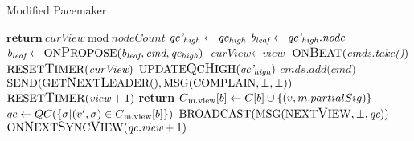 \begin{algorithm}[h!]
	\caption{Modified Pacemaker}\label{pacemaker}
	\begin{algorithmic}[1]
		\color{Green}
		\State $\textbf{return}\ \textit{curView}\ \text{mod}\ \textit{nodeCount}$
		\color{black}
	\EndFunction
			\State $ \textit{qc'\textsubscript{high}} \gets \textit{qc\textsubscript{high}} $
			\State $ \textit{b\textsubscript{leaf}} \gets \textit{qc'\textsubscript{high}.node}$
		\EndIf
	\EndProcedure
			\State $ \textit{b\textsubscript{leaf}} \gets \text{ON{\large P}ROPOSE}(\textit{b\textsubscript{leaf}}, \textit{cmd}, \textit{qc\textsubscript{high}})$
		\EndIf
	\EndProcedure
		\color{Magenta}
		\State $ \textit{curView} \gets \textit{view}$
		\State $ \text{ON{\large B}EAT}(\textit{cmds.take()})$
		\State $ \text{RESET{\large T}IMER}(\textit{curView})$
		\color{black}
	\EndProcedure
		\State $ \text{UPDATE{\large Q}C{\large H}IGH}(\textit{qc'\textsubscript{high}}) $
	\EndProcedure
	\color{Green}
		\State $ \textit{cmds.add(cmd)} $
	\EndProcedure
		\State $ \text{SEND}(\text{GET{\large N}EXT{\large L}EADER}(), \text{MSG}(\text{COMPLAIN}, \bot, \bot)) $
		\State $ \text{RESET{\large T}IMER}(\textit{view} + 1) $
	\EndProcedure
				\State \textbf{return}
			\EndIf
			\State $C\textsubscript{m.view}[b] \gets C[b] \cup \{(v, m.partialSig)\}$
				\State $qc \gets QC(\{ \sigma | (v', \sigma) \in C\textsubscript{m.view}[b]\})$
				\State $\text{BROADCAST}(\text{MSG}(\text{NEXT{\large V}IEW}, \bot, \textit{qc}))$
			\EndIf
		\EndIf
	\EndProcedure
				\State $\text{ON{\large N}EXT{\large S}YNC{\large V}IEW}(\textit{qc.view} + 1)$
		\EndIf
	\EndProcedure
	\end{algorithmic}
\end{algorithm}

